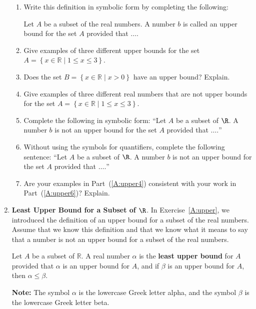 \begin{enumerate}
\begin{enumerate}
  \item Write this definition in symbolic form by completing the following:

Let  $A$  be a subset of the real numbers.  A number  $b$  is called an upper bound for the set  $A$ provided that $ \ldots .$

  \item Give examples of three different upper bounds for the set \\ 
$A = \left\{ x \in \mathbb{R} \mid 1 \leq x \leq 3 \right\}$.

  \item Does the set  $B = \left\{ x \in \mathbb{R} \mid x > 0 \right\}$ have an upper bound?  Explain.

  \item Give examples of three different real numbers that are not upper bounds for the set  
$A = \left\{ x \in \mathbb{R} \mid 1 \leq x \leq 3 \right\}$. \label{A:upper4}%

  \item Complete the following in symbolic form:  ``Let  $A$  be a subset of $\R$.  A number  $b$  is not an upper bound for the set  $A$   provided that $ \ldots .$''

  \item Without using the symbols for quantifiers, complete the following sentence:  ``Let  $A$  be a subset of $\R$.  A number  $b$  is not an upper bound for the set  $A$ provided that $ \ldots .$''  \label{A:upper6}%

  \item Are your examples in Part~(\ref{A:upper4}) consistent with your work in 
Part~(\ref{A:upper6})?  Explain.
\end{enumerate}

\item  \textbf{Least Upper Bound for a Subset of $\R$}. \label{exer:leastupper}
In Exercise~\ref{A:upper}, we introduced the definition of an upper bound for a subset of the real numbers.  Assume that we know this definition and that we know what it means to say that a number is not an upper bound for a subset of the real numbers.

Let  $A$  be a subset of  $\mathbb{R}$.  A real number  $\alpha $ is the 
\textbf{least upper bound}
%
 for  $A$  provided that  $\alpha $  is an upper bound for  $A$, and if $\beta $ is an upper bound for  $A$, then  $\alpha  \leq \beta $.

\noindent
\textbf{Note:}  The symbol  $\alpha $ is  the lowercase Greek letter alpha,  and the symbol  
$\beta $ is  the lowercase Greek letter beta.


\end{enumerate}
